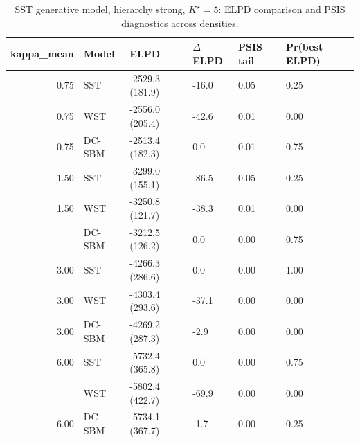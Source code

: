 \begin{table}
\centering
\caption{SST generative model, hierarchy strong, $K^\star=5$: ELPD comparison and PSIS diagnostics across densities.}
\centering
\begin{tabular}[t]{rlllll}
\toprule
kappa_mean & Model & ELPD & $\Delta$ELPD & PSIS tail & Pr(best ELPD)\\
\midrule
0.75 & SST & -2529.3 (181.9) & -16.0 & 0.05 & 0.25\\
0.75 & WST & -2556.0 (205.4) & -42.6 & 0.01 & 0.00\\
0.75 & DC-SBM & -2513.4 (182.3) & 0.0 & 0.01 & 0.75\\
1.50 & SST & -3299.0 (155.1) & -86.5 & 0.05 & 0.25\\
1.50 & WST & -3250.8 (121.7) & -38.3 & 0.01 & 0.00\\
\addlinespace
1.50 & DC-SBM & -3212.5 (126.2) & 0.0 & 0.00 & 0.75\\
3.00 & SST & -4266.3 (286.6) & 0.0 & 0.00 & 1.00\\
3.00 & WST & -4303.4 (293.6) & -37.1 & 0.00 & 0.00\\
3.00 & DC-SBM & -4269.2 (287.3) & -2.9 & 0.00 & 0.00\\
6.00 & SST & -5732.4 (365.8) & 0.0 & 0.00 & 0.75\\
\addlinespace
6.00 & WST & -5802.4 (422.7) & -69.9 & 0.00 & 0.00\\
6.00 & DC-SBM & -5734.1 (367.7) & -1.7 & 0.00 & 0.25\\
\bottomrule
\end{tabular}
\end{table}
